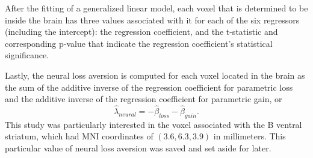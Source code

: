 \par \indent After the fitting of a generalized linear model, each voxel that is
determined to be inside the brain has three values associated with it for each
of the six regressors (including the intercept): the regression coefficient, and
the t-statistic and corresponding p-value that indicate the regression
coefficient's statistical significance.

\par \indent Lastly, the neural loss aversion is computed for each voxel located
in the brain as the sum of the additive inverse of the regression coefficient
for parametric loss and the additive inverse of the regression coefficient for
parametric gain, or
\[
\hat{ \lambda }_{ neural } = - \hat{ \beta }_{ loss } - \hat{ \beta }_{ gain }.
\]
This study was particularly interested in the voxel associated with the B
ventral striatum, which had MNI coordinates of $\left( 3.6 , 6.3 , 3.9 \right)$
in millimeters. This particular value of neural loss aversion was saved and set
aside for later.
